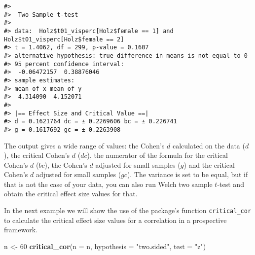 \documentclass[
  man,floatsintext]{apa7}
\newenvironment{Shaded}{\begin{snugshade}}{\end{snugshade}}
\newcommand{\AttributeTok}[1]{\textcolor[rgb]{0.13,0.29,0.53}{#1}}
\newcommand{\DecValTok}[1]{\textcolor[rgb]{0.00,0.00,0.81}{#1}}
\newcommand{\FunctionTok}[1]{\textcolor[rgb]{0.13,0.29,0.53}{\textbf{#1}}}
\newcommand{\NormalTok}[1]{#1}
\newcommand{\OtherTok}[1]{\textcolor[rgb]{0.56,0.35,0.01}{#1}}
\newcommand{\SpecialCharTok}[1]{\textcolor[rgb]{0.81,0.36,0.00}{\textbf{#1}}}
\newcommand{\StringTok}[1]{\textcolor[rgb]{0.31,0.60,0.02}{#1}}
\begin{document}
\footnotesize

\begin{Shaded}
\end{Shaded}

\begin{verbatim}
#> 
#>  Two Sample t-test
#> 
#> data:  Holz$t01_visperc[Holz$female == 1] and Holz$t01_visperc[Holz$female == 2]
#> t = 1.4062, df = 299, p-value = 0.1607
#> alternative hypothesis: true difference in means is not equal to 0
#> 95 percent confidence interval:
#>  -0.06472157  0.38876046
#> sample estimates:
#> mean of x mean of y 
#>  4.314090  4.152071 
#> 
#> |== Effect Size and Critical Value ==| 
#> d = 0.1621764 dc = ± 0.2269606 bc = ± 0.226741 
#> g = 0.1617692 gc = ± 0.2263908
\end{verbatim}

\normalsize

The output gives a wide range of values: the Cohen's \(d\) calculated on the data (\(d\)), the critical Cohen's \(d\) (\(dc\)), the numerator of the formula for the critical Cohen's \(d\) (\(bc\)), the Cohen's \(d\) adjusted for small samples (\(g\)) and the critical Cohen's \(d\) adjusted for small samples (\(gc\)). The variance is set to be equal, but if that is not the case of your data, you can also run Welch two sample \(t\)-test and obtain the critical effect size values for that.

In the next example we will show the use of the package's function \texttt{critical\_cor} to calculate the critical effect size values for a correlation in a prospective framework.

\footnotesize

\begin{Shaded}
\begin{Highlighting}[]
\NormalTok{n }\OtherTok{\textless{}{-}} \DecValTok{60}
\FunctionTok{critical\_cor}\NormalTok{(}\AttributeTok{n =}\NormalTok{ n, }\AttributeTok{hypothesis =} \StringTok{"two.sided"}\NormalTok{, }\AttributeTok{test =} \StringTok{"z"}\NormalTok{)}
\end{Highlighting}
\end{Shaded}
\end{document}
